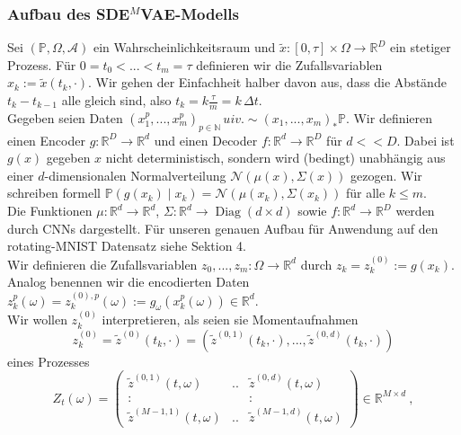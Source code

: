 \documentclass[12pt]{article}
\newcommand{\R}{\mathbb{R}}
\newcommand{\tx}{\widetilde{x}}
\newcommand{\tz}{\widetilde{z}}
\newcommand{\bP}{\mathbb{P}}
\newcommand{\N}{\mathbb{N}}
\begin{document}
	
	\newpage
	\subsubsection[Modell]{Aufbau des SDE$^{M}$VAE-Modells}
	Sei $(\bP, \Omega, \mathcal{A})$ ein Wahrscheinlichkeitsraum und $\tx : [0,\tau] \times \Omega \rightarrow \R^D$ ein stetiger Prozess. Für $0=t_0<...<t_m=\tau$ definieren wir die Zufallsvariablen $x_k := \tx(t_k,\cdot)$. Wir gehen der Einfachheit halber davon aus, dass die Abstände $t_k-t_{k-1}$ alle gleich sind, also $t_k = k\frac{\tau}{m} = k \, \Delta t$.\\
	Gegeben seien Daten $(x_1^p,...,x_m^p)_{p \in \N}\, uiv. \sim (x_1,...,x_m)_*\bP$. Wir definieren einen Encoder $g: \R^D \rightarrow \R^d$ und einen Decoder $f: \R^d \rightarrow \R^D$ für $d<<D$. Dabei ist $g(x)$ gegeben $x$ nicht deterministisch, sondern wird (bedingt) unabhängig aus einer $d$-dimensionalen Normalverteilung $\mathcal{N}(\mu(x),\Sigma(x))$ gezogen. Wir schreiben formell $\bP(g(x_k) \mid x_k) = \mathcal{N}(\mu(x_k),\Sigma(x_k))$ für alle $k \leq m$.\\
	Die Funktionen $\mu: \R^d \rightarrow \R^d$, $\Sigma: \R^d \rightarrow \operatorname{Diag}(d \times d)$ sowie $f: \R^d \rightarrow \R^D$ werden durch CNNs dargestellt. Für unseren genauen Aufbau für Anwendung auf den rotating-MNIST Datensatz siehe Sektion 4.\\
	Wir definieren die Zufallsvariablen $z_0,...,z_m : \Omega \rightarrow \R^{d}$ durch $z_k = z^{(0)}_k := g(x_k)$. Analog benennen wir die encodierten Daten $z_k^p(\omega) = z_k^{(0),p}(\omega) := g_\omega(x_k^p(\omega))\in \R^d$.\\
	Wir wollen $z^{(0)}_k$ interpretieren, als seien sie Momentaufnahmen
	$$z^{(0)}_k = \tz^{(0)}(t_k,\cdot) = ( \tz^{(0,1)}(t_k,\cdot),...,\tz^{(0,d)}(t_k,\cdot))$$
	eines Prozesses
	$$ Z_t(\omega) = \begin{pmatrix}
	\tz^{(0,1)}(t,\omega) & .. & \tz^{(0,d)}(t,\omega)\\
	: & & : \\
	\tz^{(M-1,1)}(t,\omega) & .. & \tz^{(M-1,d)}(t,\omega)
	\end{pmatrix} \in \R^{M \times d} \ ,$$
\end{document}
